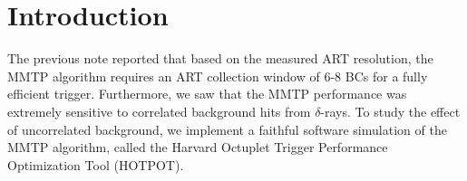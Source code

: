 \section{Introduction}
\label{sec:intro}

The previous note \cite{mmtp} reported that based on the measured ART resolution, the MMTP algorithm requires an ART collection window of 6-8 BCs for a fully efficient trigger. Furthermore, we saw that the MMTP performance was extremely sensitive to correlated background hits from $\delta$-rays. To study the effect of uncorrelated background, we implement a faithful software simulation of the MMTP algorithm, called the Harvard Octuplet Trigger Performance Optimization Tool (HOTPOT). 

